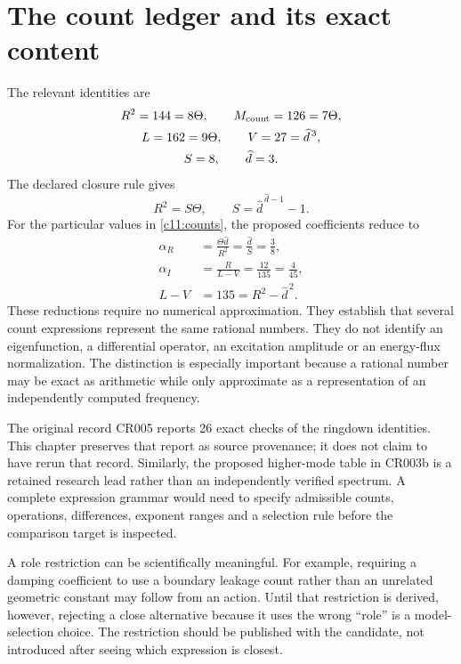 \section{The count ledger and its exact content}
The relevant identities are
\begin{equation}
 \begin{gathered}
 R^2=144=8\Theta,\qquad M_{\rm count}=126=7\Theta,\\
 L=162=9\Theta,\qquad V=27=\widehat d^{\,3},\\
 S=8,\qquad \widehat d=3.
 \end{gathered}
 \label{c11:counts}
\end{equation}
The declared closure rule gives
\begin{equation}
 R^2=S\Theta,\qquad S=\widehat d^{\,\widehat d-1}-1.
 \label{c11:closure}
\end{equation}
For the particular values in \eqref{c11:counts}, the proposed coefficients reduce to
\begin{align}
 \alpha_R&=\frac{\Theta\widehat d}{R^2}
          =\frac{\widehat d}{S}=\frac38,\label{c11:alphaR}\\
 \alpha_I&=\frac{R}{L-V}
          =\frac{12}{135}=\frac4{45},\label{c11:alphaI}\\
 L-V&=135=R^2-\widehat d^{\,2}.
 \label{c11:shell}
\end{align}
These reductions require no numerical approximation. They establish that several count expressions represent the same rational numbers. They do not identify an eigenfunction, a differential operator, an excitation amplitude or an energy-flux normalization. The distinction is especially important because a rational number may be exact as arithmetic while only approximate as a representation of an independently computed frequency.

The original record CR005 reports 26 exact checks of the ringdown identities. This chapter preserves that report as source provenance; it does not claim to have rerun that record. Similarly, the proposed higher-mode table in CR003b is a retained research lead rather than an independently verified spectrum. A complete expression grammar would need to specify admissible counts, operations, differences, exponent ranges and a selection rule before the comparison target is inspected.

A role restriction can be scientifically meaningful. For example, requiring a damping coefficient to use a boundary leakage count rather than an unrelated geometric constant may follow from an action. Until that restriction is derived, however, rejecting a close alternative because it uses the wrong ``role'' is a model-selection choice. The restriction should be published with the candidate, not introduced after seeing which expression is closest.

